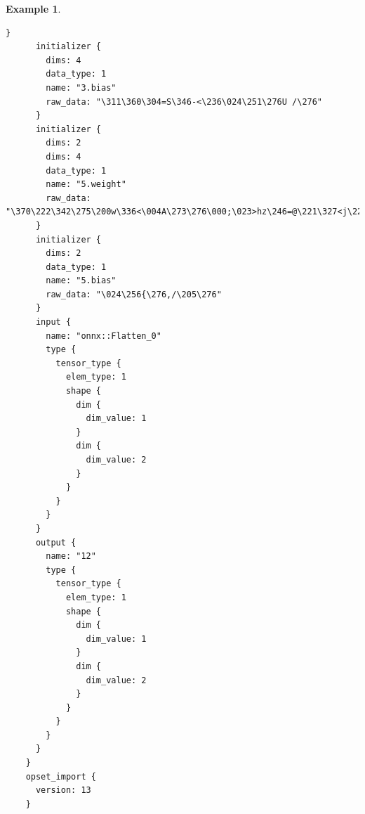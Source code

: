 \documentclass[oneside,11pt,dvipsnames]{book}
\numberwithin{equation}{section}
\theoremstyle{definition}
\newtheorem{example}{Example}[section]
\theoremstyle{remark}
\begin{document}
\begin{example}
\begin{lstlisting}[basicstyle=\ttfamily\scriptsize]
      }
      initializer {
        dims: 4
        data_type: 1
        name: "3.bias"
        raw_data: "\311\360\304=S\346-<\236\024\251\276U /\276"
      }
      initializer {
        dims: 2
        dims: 4
        data_type: 1
        name: "5.weight"
        raw_data: "\370\222\342\275\200w\336<\004A\273\276\000;\023>hz\246=@\221\327<j\222\266>\342\014\325>"
      }
      initializer {
        dims: 2
        data_type: 1
        name: "5.bias"
        raw_data: "\024\256{\276,/\205\276"
      }
      input {
        name: "onnx::Flatten_0"
        type {
          tensor_type {
            elem_type: 1
            shape {
              dim {
                dim_value: 1
              }
              dim {
                dim_value: 2
              }
            }
          }
        }
      }
      output {
        name: "12"
        type {
          tensor_type {
            elem_type: 1
            shape {
              dim {
                dim_value: 1
              }
              dim {
                dim_value: 2
              }
            }
          }
        }
      }
    }
    opset_import {
      version: 13
    }
\end{lstlisting}

\end{example}






        
\end{document}
